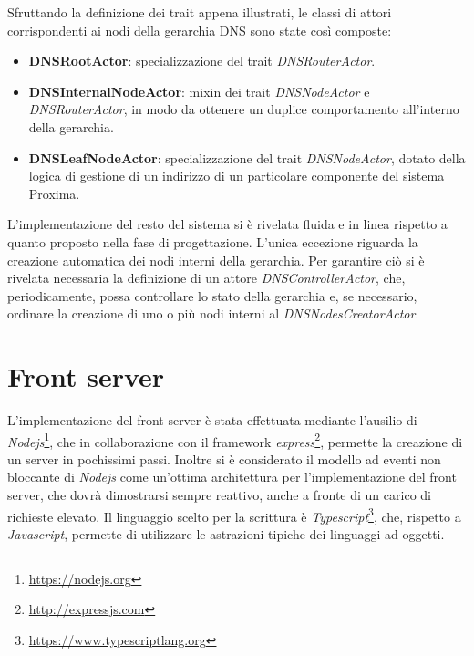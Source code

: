 \documentclass[a4paper,12pt]{report}
\begin{document}
Sfruttando la definizione dei trait appena illustrati, le classi di attori corrispondenti ai nodi della gerarchia DNS sono state così composte:
\begin{itemize}
	\item \textbf{DNSRootActor}: specializzazione del trait \emph{DNSRouterActor}.
	\item \textbf{DNSInternalNodeActor}: mixin dei trait \emph{DNSNodeActor} e \emph{DNSRouterActor}, in modo da ottenere un duplice comportamento all'interno della gerarchia.
	\item \textbf{DNSLeafNodeActor}: specializzazione del trait \emph{DNSNodeActor}, dotato della logica di gestione di un indirizzo di un particolare componente del sistema Proxima.
\end{itemize}

L'implementazione del resto del sistema si è rivelata fluida e in linea rispetto a quanto proposto nella fase di progettazione. L'unica eccezione riguarda la creazione automatica dei nodi interni della gerarchia. Per garantire ciò si è rivelata necessaria la definizione di un attore \emph{DNSControllerActor}, che, periodicamente, possa controllare lo stato della gerarchia e, se necessario, ordinare la creazione di uno o più nodi interni al \emph{DNSNodesCreatorActor}.

\section{Front server}
L'implementazione del front server è stata effettuata mediante l'ausilio di \emph{Nodejs}\footnote{\url{https://nodejs.org}}, che in collaborazione con il framework \emph{express}\footnote{\url{http://expressjs.com}}, permette la creazione di un server in pochissimi passi. Inoltre si è considerato il modello ad eventi non bloccante di \emph{Nodejs} come un'ottima architettura per l'implementazione del front server, che dovrà dimostrarsi sempre reattivo, anche a fronte di un carico di richieste elevato. Il linguaggio scelto per la scrittura è \emph{Typescript}\footnote{\url{https://www.typescriptlang.org}}, che, rispetto a \emph{Javascript}, permette di utilizzare le astrazioni tipiche dei linguaggi ad oggetti.
\end{document}
